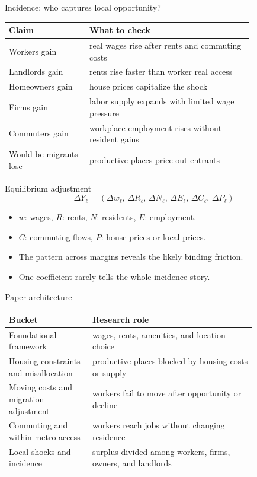 \documentclass[aspectratio=169,11pt]{beamer}
\begin{document}
\begin{frame}{Incidence: who captures local opportunity?}
\small
\begin{tabular}{p{0.27\linewidth} p{0.55\linewidth}}
\toprule
Claim & What to check \\
\midrule
Workers gain & real wages rise after rents and commuting costs \\
Landlords gain & rents rise faster than worker real access \\
Homeowners gain & house prices capitalize the shock \\
Firms gain & labor supply expands with limited wage pressure \\
Commuters gain & workplace employment rises without resident gains \\
Would-be migrants lose & productive places price out entrants \\
\bottomrule
\end{tabular}
\end{frame}

\begin{frame}{Equilibrium adjustment}
\[
\Delta Y_\ell =
\left(
\Delta w_\ell,\,
\Delta R_\ell,\,
\Delta N_\ell,\,
\Delta E_\ell,\,
\Delta C_\ell,\,
\Delta P_\ell
\right)
\]
\begin{itemize}
    \item $w$: wages, $R$: rents, $N$: residents, $E$: employment.
    \item $C$: commuting flows, $P$: house prices or local prices.
    \item The pattern across margins reveals the likely binding friction.
    \item One coefficient rarely tells the whole incidence story.
\end{itemize}
\end{frame}

\begin{frame}{Paper architecture}
\small
\begin{tabular}{p{0.28\linewidth} p{0.55\linewidth}}
\toprule
Bucket & Research role \\
\midrule
Foundational framework & wages, rents, amenities, and location choice \\
Housing constraints and misallocation & productive places blocked by housing costs or supply \\
Moving costs and migration adjustment & workers fail to move after opportunity or decline \\
Commuting and within-metro access & workers reach jobs without changing residence \\
Local shocks and incidence & surplus divided among workers, firms, owners, and landlords \\
\bottomrule
\end{tabular}
\end{frame}
\end{document}
